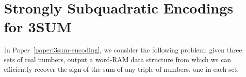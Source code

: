 \section{Strongly Subquadratic Encodings for 3SUM}







In Paper~\ref{paper:3sum-encoding},
we consider the following problem: given three sets of real numbers, output a
word-RAM data structure from which we can efficiently recover the sign of the
sum of any triple of numbers, one in each set.


